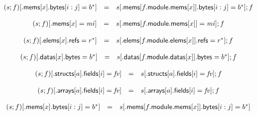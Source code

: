 $$
\begin{array}[t]{@{}lcl@{}l@{}}
(s ; f){}[{.}\mathsf{mems}{}[x]{.}\mathsf{bytes}{}[i : j] = {b^\ast}] & = & s{}[{.}\mathsf{mems}{}[f{.}\mathsf{module}{.}\mathsf{mems}{}[x]]{.}\mathsf{bytes}{}[i : j] = {b^\ast}] ; f \\
\end{array}
$$

$$
\begin{array}[t]{@{}lcl@{}l@{}}
(s ; f){}[{.}\mathsf{mems}{}[x] = {\mathit{mi}}] & = & s{}[{.}\mathsf{mems}{}[f{.}\mathsf{module}{.}\mathsf{mems}{}[x]] = {\mathit{mi}}] ; f \\
\end{array}
$$

$$
\begin{array}[t]{@{}lcl@{}l@{}}
(s ; f){}[{.}\mathsf{elems}{}[x]{.}\mathsf{refs} = {r^\ast}] & = & s{}[{.}\mathsf{elems}{}[f{.}\mathsf{module}{.}\mathsf{elems}{}[x]]{.}\mathsf{refs} = {r^\ast}] ; f \\
\end{array}
$$

$$
\begin{array}[t]{@{}lcl@{}l@{}}
(s ; f){}[{.}\mathsf{datas}{}[x]{.}\mathsf{bytes} = {b^\ast}] & = & s{}[{.}\mathsf{datas}{}[f{.}\mathsf{module}{.}\mathsf{datas}{}[x]]{.}\mathsf{bytes} = {b^\ast}] ; f \\
\end{array}
$$

$$
\begin{array}[t]{@{}lcl@{}l@{}}
(s ; f){}[{.}\mathsf{structs}{}[a]{.}\mathsf{fields}{}[i] = {\mathit{fv}}] & = & s{}[{.}\mathsf{structs}{}[a]{.}\mathsf{fields}{}[i] = {\mathit{fv}}] ; f \\
\end{array}
$$

$$
\begin{array}[t]{@{}lcl@{}l@{}}
(s ; f){}[{.}\mathsf{arrays}{}[a]{.}\mathsf{fields}{}[i] = {\mathit{fv}}] & = & s{}[{.}\mathsf{arrays}{}[a]{.}\mathsf{fields}{}[i] = {\mathit{fv}}] ; f \\
\end{array}
$$

\vspace{1ex}

$$
\begin{array}[t]{@{}lcl@{}l@{}}
(s ; f){}[{.}\mathsf{mems}{}[x]{.}\mathsf{bytes}{}[i : j] = {b^\ast}] & = & s{}[{.}\mathsf{mems}{}[f{.}\mathsf{module}{.}\mathsf{mems}{}[x]]{.}\mathsf{bytes}{}[i : j] = {b^\ast}] \\
\end{array}
$$

